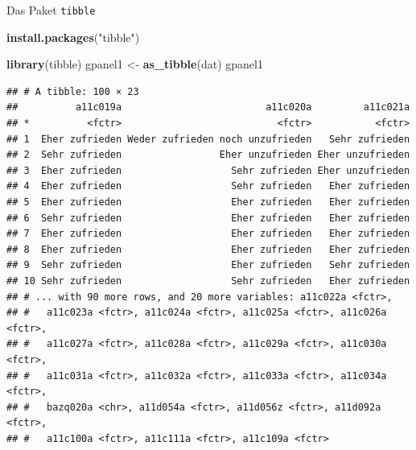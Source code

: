 \documentclass[ignorenonframetext,]{beamer}
\newenvironment{Shaded}{}{}
\newcommand{\KeywordTok}[1]{\textcolor[rgb]{0.00,0.44,0.13}{\textbf{{#1}}}}
\newcommand{\StringTok}[1]{\textcolor[rgb]{0.25,0.44,0.63}{{#1}}}
\newcommand{\NormalTok}[1]{{#1}}
\begin{document}
\begin{frame}[fragile]{Das Paket \texttt{tibble}}

\begin{Shaded}
\begin{Highlighting}[]
\KeywordTok{install.packages}\NormalTok{(}\StringTok{"tibble"}\NormalTok{)}
\end{Highlighting}
\end{Shaded}

\begin{Shaded}
\begin{Highlighting}[]
\KeywordTok{library}\NormalTok{(tibble)}
\NormalTok{gpanel1 <-}\StringTok{ }\KeywordTok{as_tibble}\NormalTok{(dat)}
\NormalTok{gpanel1}
\end{Highlighting}
\end{Shaded}

\begin{verbatim}
## # A tibble: 100 × 23
##          a11c019a                         a11c020a         a11c021a
## *          <fctr>                           <fctr>           <fctr>
## 1  Eher zufrieden Weder zufrieden noch unzufrieden   Sehr zufrieden
## 2  Sehr zufrieden                 Eher unzufrieden Eher unzufrieden
## 3  Eher zufrieden                   Sehr zufrieden Eher unzufrieden
## 4  Eher zufrieden                   Sehr zufrieden   Eher zufrieden
## 5  Eher zufrieden                   Eher zufrieden   Eher zufrieden
## 6  Sehr zufrieden                   Eher zufrieden   Eher zufrieden
## 7  Eher zufrieden                   Eher zufrieden   Eher zufrieden
## 8  Eher zufrieden                   Eher zufrieden   Eher zufrieden
## 9  Sehr zufrieden                   Eher zufrieden   Sehr zufrieden
## 10 Sehr zufrieden                   Sehr zufrieden   Eher zufrieden
## # ... with 90 more rows, and 20 more variables: a11c022a <fctr>,
## #   a11c023a <fctr>, a11c024a <fctr>, a11c025a <fctr>, a11c026a <fctr>,
## #   a11c027a <fctr>, a11c028a <fctr>, a11c029a <fctr>, a11c030a <fctr>,
## #   a11c031a <fctr>, a11c032a <fctr>, a11c033a <fctr>, a11c034a <fctr>,
## #   bazq020a <chr>, a11d054a <fctr>, a11d056z <fctr>, a11d092a <fctr>,
## #   a11c100a <fctr>, a11c111a <fctr>, a11c109a <fctr>
\end{verbatim}

\end{frame}
\end{document}
